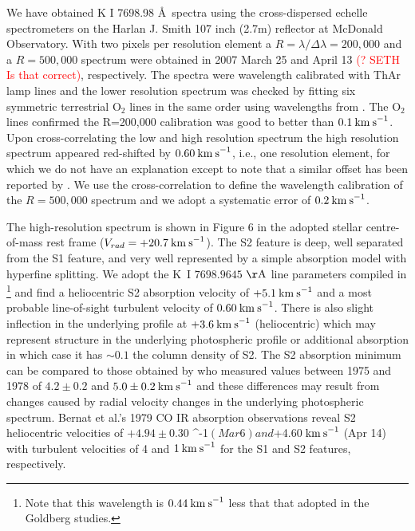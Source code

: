 \documentclass[preprint2]{aastex}
\begin{document}
We have obtained K I 7698.98 \AA \ spectra using the cross-dispersed echelle spectrometers on the Harlan J. Smith 107 inch (2.7m) reflector at McDonald Observatory. With two pixels per resolution element a $R=\lambda/\Delta\lambda=200,000$ and a $R=500,000$ spectrum were obtained in 2007 March 25 and April 13 \textcolor{red}{(? SETH Is that correct)}, respectively. The spectra were wavelength calibrated with ThAr lamp lines and the lower resolution spectrum was checked by fitting six symmetric terrestrial O${}_2$ lines in the same order using wavelengths from \cite{1948ApJ...108..167B}. The O${}_2$ lines confirmed the R=200,000 calibration was good to better than $0.1\>{\rm km\>s}^{-1}$. Upon cross-correlating the low and high resolution spectrum the high resolution spectrum appeared red-shifted by $0.60\>{\rm km\>s}^{-1}$, i.e., one resolution element, for which we do not have an explanation except to note that a similar offset has been reported by \cite{1994ApJ...436..152W}. We use the cross-correlation to define the wavelength calibration of the $R=500,000$ spectrum and we adopt a systematic error of $0.2\>{\rm km\>s}^{-1}$.

The high-resolution spectrum is shown in Figure 6 in the adopted stellar centre-of-mass rest frame 
($V_{rad}=+20.7\>{\rm km\>s}^{-1}$). The S2 feature is deep, well separated from the S1 feature, and very well represented by a simple absorption model with hyperfine splitting. We adopt the K~I $7698.9645$ $\rm{\AA}$ line parameters compiled in \cite{2003ApJS..149..205M}\footnote{Note that this wavelength is $0.44\>{\rm km\>s}^{-1}$ less that that adopted in the Goldberg studies.} and find a heliocentric S2 absorption velocity of $+5.1\>{\rm km\>s}^{-1}$ and a most probable line-of-sight turbulent velocity of $0.60\>{\rm km\>s}^{-1}$. There is also slight inflection in the underlying profile at $+3.6\>{\rm km\>s}^{-1}$ (heliocentric) which may represent structure in the underlying photospheric profile or additional absorption in which case it has $\sim 0.1$ the column density of S2.  The S2 absorption minimum can be compared to those obtained by \citet[Fig 7]{1979QJRAS..20..361G} who measured values between 1975 and 1978 of $4.2\pm 0.2$ and $5.0\pm 0.2 \>{\rm km\>s}^{-1}$ and these differences may result from changes caused by radial velocity changes in the underlying photospheric spectrum. Bernat et al.'s 1979 CO IR absorption observations reveal S2 heliocentric velocities of $+4.94\pm 0.30$ ^{-1}$ (Mar 6) and $+4.60$ \>{\rm km\>s}^{-1}$ (Apr 14) with turbulent velocities of 4 and $1\>{\rm km\>s}^{-1}$ for the S1 and S2 features, respectively.
\end{document}
